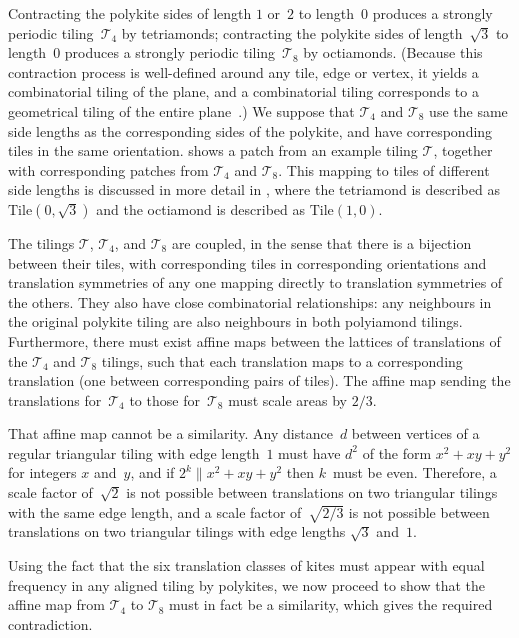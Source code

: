 Contracting the polykite sides of length $1$ or~$2$ to length~$0$
produces a strongly periodic tiling~$\mathcal{T}_4$ by tetriamonds;
contracting the polykite sides of length~$\sqrt{3}$ to length~$0$
produces a strongly periodic tiling~$\mathcal{T}_8$ by octiamonds.
(Because this contraction process is well-defined around any tile,
edge or vertex, it yields a combinatorial tiling of the plane, and a
combinatorial tiling corresponds to a geometrical tiling of the entire
plane~\cite[Lemma~1.1]{regprod}.)  We
suppose that $\mathcal{T}_4$ and $\mathcal{T}_8$ use the same side
lengths as the corresponding sides of the polykite, and have
corresponding tiles in the same orientation.  
 shows a patch from an example tiling $\mathcal{T}$, together
with corresponding patches from $\mathcal{T}_4$ and $\mathcal{T}_8$.
This mapping to tiles of
different side lengths is discussed in more detail in
, where the tetriamond is described as
$\mathrm{Tile}(0,\sqrt{3})$ and the octiamond is described as
$\mathrm{Tile}(1,0)$.

The tilings $\mathcal{T}$, $\mathcal{T}_4$, and $\mathcal{T}_8$ 
are coupled, in the sense that there is a bijection
between their tiles, with corresponding tiles in corresponding
orientations and translation symmetries of any one mapping directly to
translation symmetries of the others.  They also have close combinatorial
relationships: any neighbours in the original
polykite tiling are also neighbours in both polyiamond tilings.  Furthermore,
there must exist affine maps between the lattices of translations of the
$\mathcal{T}_4$ and $\mathcal{T}_8$ tilings, such that
each translation maps to
a corresponding translation (one between corresponding pairs of
tiles).  The affine map sending the translations for~$\mathcal{T}_4$
to those for~$\mathcal{T}_8$ must scale areas by $2/3$.

That affine map cannot be a similarity.  Any distance~$d$ between
vertices of a regular triangular tiling with edge length~$1$ must have
$d^2$ of the form $x^2+xy+y^2$ for integers $x$ and~$y$, and if $2^k
\parallel x^2+xy+y^2$ then $k$~must be even.  Therefore, a scale factor
of~$\sqrt{2}$ is not possible between translations on two triangular
tilings with the same edge length, and a scale factor of~$\sqrt{2/3}$
is not possible between translations on two triangular tilings with
edge lengths $\sqrt{3}$ and~$1$.

Using the fact that the six translation classes of kites must appear
with equal frequency in any aligned tiling by polykites, we now
proceed to show that the affine map from $\mathcal{T}_4$ to 
$\mathcal{T}_8$ must in fact be a similarity, which
gives the required contradiction.


